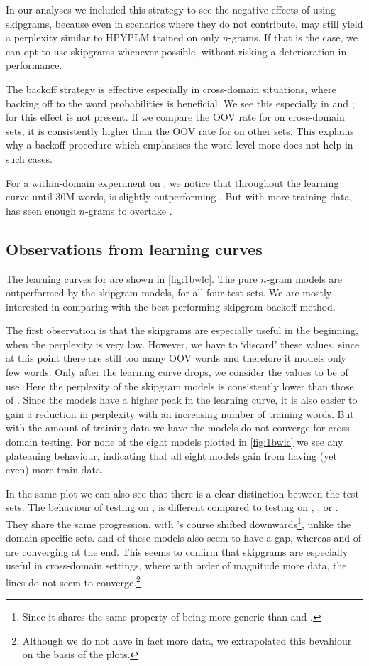 In our analyses we included this strategy to see the negative effects of using skipgrams, because even in scenarios where they do not contribute, \BON may still yield a perplexity similar to HPYPLM trained on only $n$-grams. If that is the case, we can opt to use skipgrams whenever possible, without risking a deterioration in performance.

The \BOF backoff strategy is effective especially in cross-domain situations, where backing off to the word probabilities is beneficial. We see this especially in \jrc and \emea; for \wp this effect is not present. If we compare the OOV rate for \wp on cross-domain sets, it is consistently higher than the OOV rate for \obw on other sets. This explains why a backoff procedure which emphasises the word level more does not help in such cases.

For a within-domain experiment on \obw, we notice that throughout the learning curve until 30M words, \BOF is slightly outperforming \BOL. But with more training data, \BOL has seen enough $n$-grams to overtake \BOF.

\subsection{Observations from \obw learning curves}

The learning curves for \obw are shown in \cref{fig:1bwlc}. The pure $n$-gram models are outperformed by the skipgram models, for all four test sets. We are mostly interested in comparing \BON with the best performing skipgram backoff method.

The first observation is that the skipgrams are especially useful in the beginning, when the perplexity is very low. However, we have to `discard' these values, since at this point there are still too many OOV words and therefore it models only few words. Only after the learning curve drops, we consider the values to be of use. Here the perplexity of the skipgram models is consistently lower than those of \BON. Since the \BON models have a higher peak in the learning curve, it is also easier to gain a reduction in perplexity with an increasing number of training words. But with the amount of training data we have the models do not converge for cross-domain testing. For none of the eight models plotted in \cref{fig:1bwlc} we see any plateauing behaviour, indicating that all eight models gain from having (yet even) more train data.

In the same plot we can also see that there is a clear distinction between the test sets. The behaviour of testing on \obw, is different compared to testing on \jrc, \emea, or \wp. They share the same progression, with \wp's course shifted downwards\footnote{Since it shares the same property of being more generic than \jrc and \emea.}, unlike the domain-specific sets. \BON and \BOF of these models also seem to have a gap, whereas \BON and \BOL of \obw are converging at the end. This seems to confirm that skipgrams are especially useful in cross-domain settings, where with order of magnitude more data, the lines do not seem to converge.\footnote{Although we do not have in fact more data, we extrapolated this bevahiour on the basis of the plots.}

